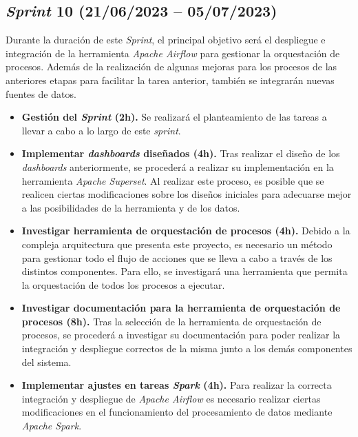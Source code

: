 \subsection{\textit{Sprint} 10 (21/06/2023 -- 05/07/2023)}

Durante la duración de este \textit{Sprint}, el principal objetivo será el despliegue e integración de la herramienta \textit{Apache Airflow} para gestionar la orquestación de procesos. Además de la realización de algunas mejoras para los procesos de las anteriores etapas para facilitar la tarea anterior, también se integrarán nuevas fuentes de datos.

\begin{itemize}

    \item \textbf{Gestión del \textit{Sprint} (2h).} Se realizará el planteamiento de las tareas a llevar a cabo a lo largo de este \textit{sprint}.

    \item \textbf{Implementar \textit{dashboards} diseñados (4h).} Tras realizar el diseño de los \textit{dashboards} anteriormente, se procederá a realizar su implementación en la herramienta \textit{Apache Superset}. Al realizar este proceso, es posible que se realicen ciertas modificaciones sobre los diseños iniciales para adecuarse mejor a las posibilidades de la herramienta y de los datos.

    \item \textbf{Investigar herramienta de orquestación de procesos (4h).} Debido a la compleja arquitectura que presenta este proyecto, es necesario un método para gestionar todo el flujo de acciones que se lleva a cabo a través de los distintos componentes. Para ello, se investigará una herramienta que permita la orquestación de todos los procesos a ejecutar.

    \item \textbf{Investigar documentación para la herramienta de orquestación de procesos (8h).} Tras la selección de la herramienta de orquestación de procesos, se procederá a investigar su documentación para poder realizar la integración y despliegue correctos de la misma junto a los demás componentes del sistema.
    
    \item \textbf{Implementar ajustes en tareas \textit{Spark} (4h).} Para realizar la correcta integración y despliegue de \textit{Apache Airflow} es necesario realizar ciertas modificaciones en el funcionamiento del procesamiento de datos mediante \textit{Apache Spark}.
    

\end{itemize}
